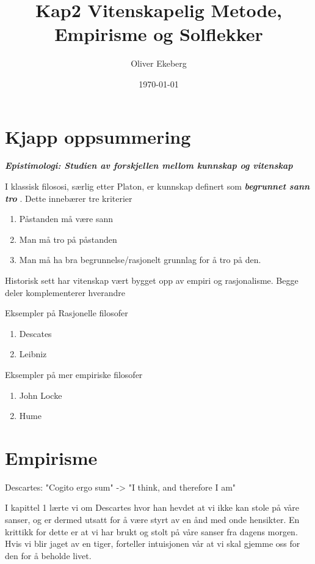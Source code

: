 \documentclass[11pt]{article}
\title{Kap2 Vitenskapelig Metode, Empirisme og Solflekker}
\author{Oliver Ekeberg}
\date{\today}
\begin{document}
\maketitle


\tableofcontents

\section{Kjapp oppsummering}

\textbf{\textit{Epistimologi: Studien av forskjellen mellom kunnskap og vitenskap}}

I klassisk filososi, særlig etter Platon, er kunnskap definert som \textbf{\textit{begrunnet sann tro}}
. Dette innebærer tre kriterier 

\begin{enumerate}
    \item Påstanden må være sann
    \item Man må tro på påstanden
    \item Man må ha bra begrunnelse/rasjonelt grunnlag for å tro på den.  
\end{enumerate}


Historisk sett har vitenskap vært bygget opp av empiri og rasjonalisme. Begge deler komplementerer hverandre

Eksempler på Rasjonelle filosofer
\begin{enumerate}
    \item Descates
    \item Leibniz
\end{enumerate}

Eksempler på mer empiriske filosofer

\begin{enumerate}
    \item John Locke
    \item Hume
\end{enumerate}


\section{Empirisme}





Descartes: "Cogito ergo sum" -> "I think, and therefore I am"


I kapittel 1 lærte vi om Descartes hvor han hevdet at vi ikke kan stole på våre sanser, og er dermed utsatt for å være styrt av en ånd med onde hensikter. 
En krittikk for dette er at vi har brukt og stolt på våre sanser fra dagens morgen. Hvis vi blir jaget av en tiger, forteller 
intuisjonen vår at vi skal gjemme oss for den for å beholde livet.
\end{document}
